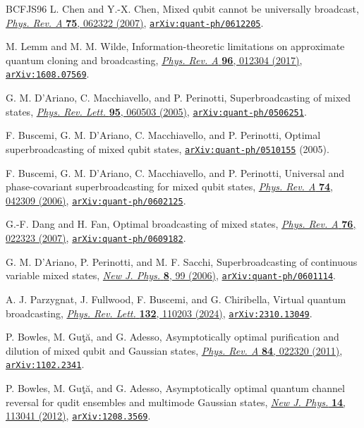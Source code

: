\documentclass[11pt]{article}
\theoremstyle{remark}
\theoremstyle{plain}
\newcommand{\doi}[2]{\href{https://doi.org/#1}{#2}}
\newcommand{\arxiv}[1]{\href{https://arxiv.org/abs/#1}{\texttt{arXiv:#1}}}
\begin{document}
\begin{thebibliography}{BCFJS96}
L. Chen and Y.-X. Chen,
Mixed qubit cannot be universally broadcast,
\doi{10.1103/PhysRevA.75.062322}{\emph{Phys. Rev. A} \textbf{75}, 062322 (2007)},
\arxiv{quant-ph/0612205}.

M. Lemm and M. M. Wilde,
Information-theoretic limitations on approximate quantum cloning and broadcasting,
\doi{10.1103/PhysRevA.96.012304}{\emph{Phys. Rev. A} \textbf{96}, 012304 (2017)},
\arxiv{1608.07569}.

G. M. D'Ariano, C. Macchiavello, and P. Perinotti,
Superbroadcasting of mixed states,
\doi{10.1103/PhysRevLett.95.060503}{\emph{Phys. Rev. Lett.} \textbf{95}, 060503 (2005)},
\arxiv{quant-ph/0506251}.

F. Buscemi, G. M. D'Ariano, C. Macchiavello, and P. Perinotti,
Optimal superbroadcasting of mixed qubit states,
\arxiv{quant-ph/0510155} (2005).

F. Buscemi, G. M. D'Ariano, C. Macchiavello, and P. Perinotti,
Universal and phase-covariant superbroadcasting for mixed qubit states,
\doi{10.1103/PhysRevA.74.042309}{\emph{Phys. Rev. A} \textbf{74}, 042309 (2006)},
\arxiv{quant-ph/0602125}.

G.-F. Dang and H. Fan,
Optimal broadcasting of mixed states,
\doi{10.1103/PhysRevA.76.022323}{\emph{Phys. Rev. A} \textbf{76}, 022323 (2007)},
\arxiv{quant-ph/0609182}.

G. M. D'Ariano, P. Perinotti, and M. F. Sacchi,
Superbroadcasting of continuous variable mixed states,
\doi{10.1088/1367-2630/8/6/099}{\emph{New J. Phys.} \textbf{8}, 99 (2006)},
\arxiv{quant-ph/0601114}.

A. J. Parzygnat, J. Fullwood, F. Buscemi, and G. Chiribella,
Virtual quantum broadcasting,
\doi{10.1103/PhysRevLett.132.110203}{\emph{Phys. Rev. Lett.} \textbf{132}, 110203 (2024)},
\arxiv{2310.13049}.

P. Bowles, M. Gu{\c t}{\u a}, and G. Adesso,
Asymptotically optimal purification and dilution of mixed qubit and Gaussian states,
\doi{10.1103/PhysRevA.84.022320}{\emph{Phys. Rev. A} \textbf{84}, 022320 (2011)},
\arxiv{1102.2341}.

P. Bowles, M. Gu{\c t}{\u a}, and G. Adesso,
Asymptotically optimal quantum channel reversal for qudit ensembles and multimode Gaussian states,
\doi{10.1088/1367-2630/14/11/113041}{\emph{New J. Phys.} \textbf{14}, 113041 (2012)},
\arxiv{1208.3569}.


\end{thebibliography}
\end{document}
